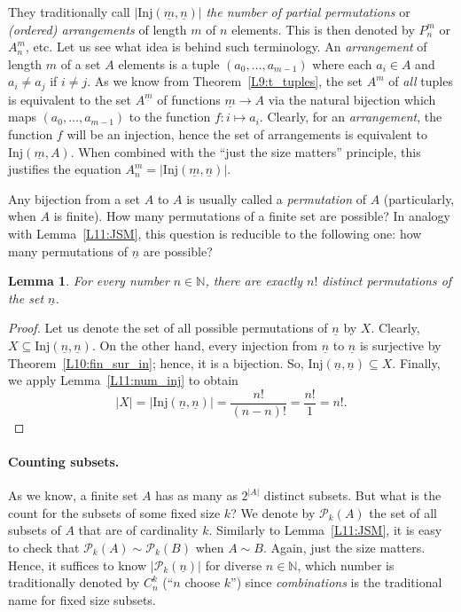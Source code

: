 \documentclass[12pt,notitlepage]{article}
\theoremstyle{plain}
\newtheorem{lemma}[thm]{Lemma}
\theoremstyle{definition}
\theoremstyle{plain}
\newcommand{\N}{\mathbb{N}}
\newcommand{\sbs}{\subseteq}
\newcommand{\mP}{\mathcal{P}}
\newcommand{\ul}[1]{\underline{#1}}
\newcommand{\1}{\mathbf{1}}
\newcommand{\0}{\mathbf{0}}
\begin{document}
They traditionally call $|\mathrm{Inj}(\ul{m},\ul{n})|$ \emph{the number of partial permutations} or \emph{(ordered) arrangements} of length $m$ of $n$ elements. This is then denoted by $P^m_n$ or $A^m_n$, etc.
Let us see what idea is behind such terminology. An \emph{arrangement} of length $m$ of a set $A$ elements is a tuple $(a_0,\ldots,a_{m-1})$ where each $a_i \in A$ and $a_i \neq a_j$ if $i \neq j$. As we know from Theorem~\ref{L9:t_tuples}, the set $A^m$ of \emph{all} tuples is equivalent to the set $A^{\ul{m}}$ of functions $\ul{m} \to A$ via the natural bijection which maps $(a_0,\ldots,a_{m-1})$ to the function $f \colon i \mapsto a_i$. Clearly, for an \emph{arrangement}, the function $f$ will be an injection, hence the set of arrangements is equivalent to $\mathrm{Inj}(\ul{m},A)$. When combined with the ``just the size matters'' principle, this justifies the equation $A^m_n = |\mathrm{Inj}(\ul{m},\ul{n})|$.


Any bijection from a set $A$ to $A$ is usually called a \emph{permutation} of $A$ (particularly, when $A$ is finite). How many permutations of a finite set are possible? In analogy with Lemma~\ref{L11:JSM}, this question is reducible to the following one: how many permutations of $\ul{n}$ are possible?

\begin{lemma}\label{L11:num_bij}
For every number $n \in \N$, there are exactly $n!$ distinct permutations of the set $\ul{n}$.
\end{lemma}
\begin{proof}
Let us denote the set of all possible permutations of $\ul{n}$ by $X$. Clearly, $X \sbs \mathrm{Inj}(\ul{n},\ul{n})$. On the other hand, every injection from $\ul{n}$ to $\ul{n}$ is surjective by Theorem~\ref{L10:fin_sur_in}; hence, it is a bijection. So, $\mathrm{Inj}(\ul{n},\ul{n}) \sbs X$. Finally, we apply Lemma~\ref{L11:num_inj} to obtain
$$|X| = |\mathrm{Inj}(\ul{n},\ul{n})| = \dfrac{n!}{(n-n)!} = \dfrac{n!}{1} = n!.$$
\end{proof}

\paragraph{Counting subsets.} As we know, a finite set $A$ has as many as $2^{|A|}$ distinct subsets. But what is the count for the subsets of some fixed size $k$? We denote by $\mP_k(A)$ the set of all subsets of $A$ that are of cardinality $k$. Similarly to Lemma~\ref{L11:JSM}, it is easy to check that $\mP_k(A) \sim \mP_k(B)$ when $A \sim B$. Again, just the size matters. Hence, it suffices to know $|\mP_k(\ul{n})|$ for diverse $n \in \N$, which number is traditionally denoted by $C_n^k$ (``$n$ choose $k$'') since \emph{combinations} is the traditional name for fixed size subsets.
\end{document}
